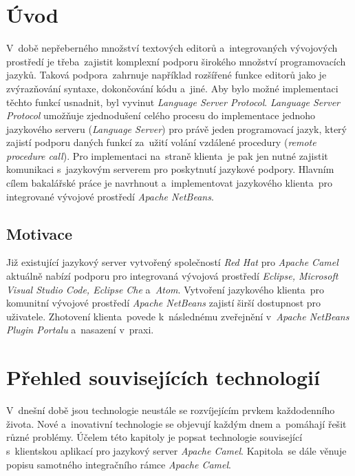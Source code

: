 \chapter{Úvod}
\label{uvod}
V~době nepřeberného množství textových editorů a~integrovaných vývojových prostředí je třeba~zajistit komplexní podporu širokého množství programovacích jazyků. Taková podpora~zahrnuje například rozšířené funkce editorů jako je zvýrazňování syntaxe, dokončování kódu a~jiné.  Aby bylo možné implementaci těchto funkcí usnadnit, byl vyvinut \emph{Language Server Protocol}. \emph{Language Server Protocol} umožňuje zjednodušení celého procesu do implementace jednoho jazykového serveru (\emph{Language Server}) pro právě jeden programovací jazyk, který zajistí podporu daných funkcí za~užití volání vzdálené procedury (\emph{remote procedure call}). Pro implementaci na~straně klienta~je pak jen nutné zajistit komunikaci s~jazykovým serverem pro poskytnutí jazykové podpory. Hlavním cílem bakalářské práce je navrhnout a~implementovat jazykového klienta~pro integrované vývojové prostředí \emph{Apache NetBeans}.

\section{Motivace}
Již existující jazykový server vytvořený společností \emph{Red Hat} pro \emph{Apache Camel}~\cite{CamelLanguageServerGithub} aktuálně nabízí podporu pro integrovaná vývojová prostředí \emph{Eclipse, Microsoft Visual Studio Code, Eclipse Che} a~\emph{Atom}. Vytvoření jazykového klienta~pro komunitní vývojové prostředí \emph{Apache NetBeans} zajistí širší dostupnost pro uživatele. Zhotovení klienta~povede k~následnému zveřejnění v~\emph{Apache NetBeans Plugin Portalu} a~nasazení v~praxi.

\chapter{Přehled souvisejících technologií}
V~dnešní době jsou technologie neustále se rozvíjejícím prvkem každodenního života. Nové a~inovativní technologie se objevují každým dnem a~pomáhají řešit různé problémy. Účelem této kapitoly je popsat technologie související s~klientskou aplikací pro jazykový server \emph{Apache Camel}. Kapitola~se dále věnuje popisu samotného integračního rámce \emph{Apache Camel}.

